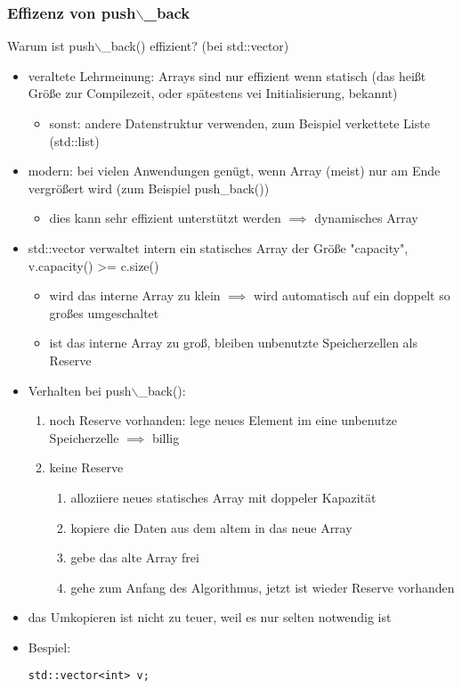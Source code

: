 \documentclass[a4paper]{scrartcl}
\theoremstyle{definition}
\theoremstyle{plain}
\theoremstyle{remark}
\theoremstyle{remark}
\begin{document}
\subsubsection{Effizenz von push$\backslash$\_back}
\label{sec-11-1-1}
Warum ist push$\backslash$\_back() effizient? (bei std::vector)
\begin{itemize}
\item veraltete Lehrmeinung: Arrays sind nur effizient wenn statisch (das heißt Größe zur Compilezeit, oder spätestens vei Initialisierung, bekannt)
\begin{itemize}
\item sonst: andere Datenstruktur verwenden, zum Beispiel verkettete Liste (std::list)
\end{itemize}
\item modern: bei vielen Anwendungen genügt, wenn Array (meist) nur am Ende vergrößert wird (zum Beispiel push\_back())
\begin{itemize}
\item dies kann sehr effizient unterstützt werden $\implies$ dynamisches Array
\end{itemize}
\item std::vector verwaltet intern ein statisches Array der Größe "capacity", v.capacity() >= c.size()
\begin{itemize}
\item wird das interne Array zu klein $\implies$ wird automatisch auf ein doppelt so großes umgeschaltet
\item ist das interne Array zu groß, bleiben unbenutzte Speicherzellen als Reserve
\end{itemize}
\item Verhalten bei push$\backslash$\_back():
\begin{enumerate}
\item noch Reserve vorhanden: lege neues Element im eine unbenutze Speicherzelle $\implies$ billig
\item keine Reserve
\begin{enumerate}
\item alloziiere neues statisches Array mit doppeler Kapazität
\item kopiere die Daten aus dem altem in das neue Array
\item gebe das alte Array frei
\item gehe zum Anfang des Algorithmus, jetzt ist wieder Reserve vorhanden
\end{enumerate}
\end{enumerate}
\item das Umkopieren ist nicht zu teuer, weil es nur selten notwendig ist
\item Bespiel:
\begin{verbatim}
std::vector<int> v;


\end{verbatim}
\end{itemize}
\end{document}
